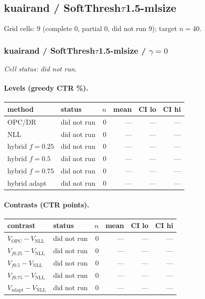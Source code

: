 \documentclass[10pt,a4paper]{article}
\begin{document}
\subsection{kuairand / SoftThresh$\tau$1.5-mlsize}
Grid cells: 9 (complete 0, partial 0, did not run 9); target $n=40$.
\subsubsection{kuairand / SoftThresh$\tau$1.5-mlsize / $\gamma=0$}
\emph{Cell status: did not run}.
\paragraph{Levels (greedy CTR \%).}
{\centering\small\begin{tabular}{llrrrr}
\toprule method & status & $n$ & mean & CI lo & CI hi \\
\midrule
OPC/DR & did not run & 0 & --- & --- & --- \\
NLL & did not run & 0 & --- & --- & --- \\
hybrid $f{=}0.25$ & did not run & 0 & --- & --- & --- \\
hybrid $f{=}0.5$ & did not run & 0 & --- & --- & --- \\
hybrid $f{=}0.75$ & did not run & 0 & --- & --- & --- \\
hybrid adapt & did not run & 0 & --- & --- & --- \\
\bottomrule\end{tabular}\par}
\paragraph{Contrasts (CTR points).}
{\centering\small\begin{tabular}{llrrrr}
\toprule contrast & status & $n$ & mean & CI lo & CI hi \\
\midrule
$V_{\mathrm{OPC}}-V_{\mathrm{NLL}}$ & did not run & 0 & --- & --- & --- \\
$V_{f0.25}-V_{\mathrm{NLL}}$ & did not run & 0 & --- & --- & --- \\
$V_{f0.5}-V_{\mathrm{NLL}}$ & did not run & 0 & --- & --- & --- \\
$V_{f0.75}-V_{\mathrm{NLL}}$ & did not run & 0 & --- & --- & --- \\
$V_{\mathrm{adapt}}-V_{\mathrm{NLL}}$ & did not run & 0 & --- & --- & --- \\
\bottomrule\end{tabular}\par}
\bigskip
\end{document}

